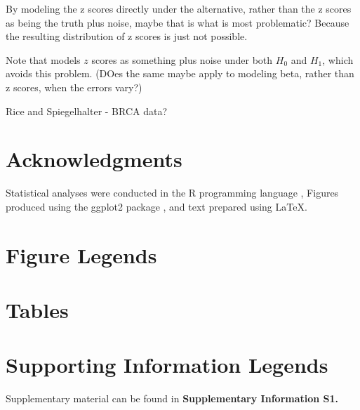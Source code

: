 \documentclass[11pt]{article}
\begin{document}
By modeling the z scores directly under the alternative, rather than the z scores as being the truth plus noise,
maybe that is what is most problematic? Because the resulting distribution of z scores is just not possible.

Note that \cite{muralidharan:2012} models $z$ scores as something plus noise under both $H_0$ and $H_1$, which
avoids this problem. (DOes the same maybe apply to modeling beta, rather than z scores, when the errors vary?)

Rice and Spiegelhalter - BRCA data?


\section*{Acknowledgments}

Statistical analyses were conducted in the {\sf R} programming language \cite{Rcore:2012}, Figures produced using the ggplot2 package \cite{ggplot2}, and text
prepared using \LaTeX.



\section*{Figure Legends}


\clearpage

\section*{Tables}

\section*{Supporting Information Legends}

Supplementary material can be found in {\bf Supplementary Information S1.}
\end{document}
